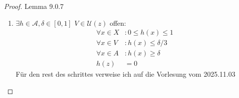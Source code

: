 \begin{proof}{Lemma 9.0.7}
    
    \begin{enumerate}
        \item[(1.)] $\exists h \in \mathcal{A}, \delta \in [0,1]$ $V \in \mathcal{U}(z)$  offen:
        \begin{equation*}
            \begin{split}
                \forall x \in X &: 0 \leq h(x) \leq 1\\
                \forall x \in V &: h(x) \leq \delta/3\\
                \forall x \in A &: h(x) \geq \delta\\
                h(z) &= 0
            \end{split}
        \end{equation*}
        Für den rest des schrittes verweise ich auf die Vorlesung vom 2025.11.03


\end{enumerate}
\end{proof}
